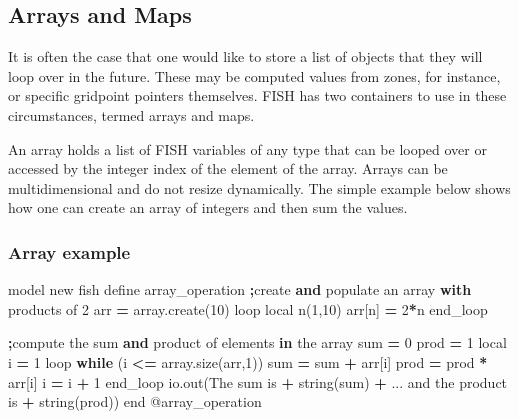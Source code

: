 \documentclass[a4paper, nobind]{templates/ociamthesis}
\newenvironment{Shaded}{\begin{snugshade}}{\end{snugshade}}
\newcommand{\AttributeTok}[1]{\textcolor[rgb]{0.77,0.63,0.00}{#1}}
\newcommand{\BuiltInTok}[1]{#1}
\newcommand{\ControlFlowTok}[1]{\textcolor[rgb]{0.13,0.29,0.53}{\textbf{#1}}}
\newcommand{\DecValTok}[1]{\textcolor[rgb]{0.00,0.00,0.81}{#1}}
\newcommand{\KeywordTok}[1]{\textcolor[rgb]{0.13,0.29,0.53}{\textbf{#1}}}
\newcommand{\NormalTok}[1]{#1}
\newcommand{\OperatorTok}[1]{\textcolor[rgb]{0.81,0.36,0.00}{\textbf{#1}}}
\newcommand{\StringTok}[1]{\textcolor[rgb]{0.31,0.60,0.02}{#1}}
\renewenvironment{Shaded}
{
  \vspace{10pt}%
  \begin{snugshade}%
}{%
  \end{snugshade}%
  \vspace{8pt}%
}
\begin{document}
\hypertarget{arrays-and-maps}{%
\subsection{Arrays and Maps}\label{arrays-and-maps}}

It is often the case that one would like to store a list of objects that they will loop over in the future. These may be computed values from zones, for instance, or specific gridpoint pointers themselves. FISH has two containers to use in these circumstances, termed arrays and maps.

An array holds a list of FISH variables of any type that can be looped over or accessed by the integer index of the element of the array. Arrays can be multidimensional and do not resize dynamically. The simple example below shows how one can create an array of integers and then sum the values.

\hypertarget{array-example}{%
\subsubsection{Array example}\label{array-example}}

\begin{Shaded}
\begin{Highlighting}[]
\NormalTok{model new}
\NormalTok{fish define array\_operation}
    \OperatorTok{;}\NormalTok{create }\KeywordTok{and}\NormalTok{ populate an array }\ControlFlowTok{with}\NormalTok{ products of }\DecValTok{2}
\NormalTok{    arr }\OperatorTok{=}\NormalTok{ array.create(}\DecValTok{10}\NormalTok{)}
\NormalTok{    loop local n(}\DecValTok{1}\NormalTok{,}\DecValTok{10}\NormalTok{)}
\NormalTok{        arr[n] }\OperatorTok{=} \DecValTok{2}\OperatorTok{*}\NormalTok{n}
\NormalTok{    end\_loop}
      
    \OperatorTok{;}\NormalTok{compute the }\BuiltInTok{sum} \KeywordTok{and}\NormalTok{ product of elements }\KeywordTok{in}\NormalTok{ the array}
    \BuiltInTok{sum} \OperatorTok{=} \DecValTok{0}
\NormalTok{    prod }\OperatorTok{=} \DecValTok{1}
\NormalTok{    local i }\OperatorTok{=} \DecValTok{1}
\NormalTok{    loop }\ControlFlowTok{while}\NormalTok{ (i }\OperatorTok{\textless{}=}\NormalTok{ array.size(arr,}\DecValTok{1}\NormalTok{))}
        \BuiltInTok{sum} \OperatorTok{=} \BuiltInTok{sum} \OperatorTok{+}\NormalTok{ arr[i]}
\NormalTok{        prod }\OperatorTok{=}\NormalTok{ prod }\OperatorTok{*}\NormalTok{ arr[i]}
\NormalTok{        i }\OperatorTok{=}\NormalTok{ i }\OperatorTok{+} \DecValTok{1}
\NormalTok{    end\_loop}
\NormalTok{    io.out(}\StringTok{\textquotesingle{}The sum is \textquotesingle{}} \OperatorTok{+}\NormalTok{ string(}\BuiltInTok{sum}\NormalTok{) }\OperatorTok{+}\NormalTok{ ...}
           \StringTok{\textquotesingle{} and the product is \textquotesingle{}} \OperatorTok{+}\NormalTok{ string(prod))}
\NormalTok{end}
\AttributeTok{@array\_operation}
\end{Highlighting}
\end{Shaded}
\end{document}
